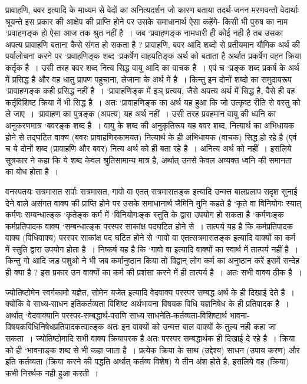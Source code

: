 {प्रावाहणि, बवर इत्यादि के माध्यम से वेदों का अनित्यदर्शन जो कारण बताया तदर्थ-जनन मरणवन्तो वेदार्थाः श्रूयन्ते इस प्रकार की आक्षेप की प्राप्ति होने पर उसके समाधानार्थ ऐसा कहेंगे- किसी भी पुरुष का नाम ‘प्रवाहणङ्क हो ऐसा आज तक श्रुत नहीं है~। जब ‘प्रवाहणङ्क नामधारी ही कोई नही है तब उसका अपत्य प्रावाहणि बताना कैसे संगत हो सकता है ? प्रावाहणि, बवर आदि शब्दो से प्रतीयमान यौगिक अर्थ की पर्यालोचना करने पर ‘प्रवाहणिङ्क शब्द ‘प्रकर्षेण वाहयतिङ्क अर्थ को बताता है अर्थात प्रकर्षेण वहन क्रिया कर्तृक है~। उसी तरह बवर शब्द नित्य सिद्ध वायु आदि का वाचक है~। एवं च ‘प्रङ्क शब्द प्रकर्ष के अर्थ में प्रसिद्ध है और वह धातु प्रापण पहुचाना, लेजाना के अर्थ में है~। किन्तु इन दोनों शब्दो का समुदायरूप ‘प्रावाहणङ्क कही प्रसिद्ध नहीं है~। ‘प्रावाहणिङ्क में इञ् प्रत्यय, जैसे अपत्य अर्थ में सिद्ध है, वैसे ही वह कर्तृविशिष्ट क्रिया में भी सिद्ध है~। अतः ‘प्रावाहणिङ्क का अर्थ यह हुआ कि जो उत्कृष्ट रीति से वस्तु को ले जाए~। ‘प्रावाहण का पुत्रङ्क (अपत्य) यह अर्थ नहीं~। उसी तरह प्रवहमान वायु की ध्वनि का अनुकरणमात्र ‘बवरङ्क शब्द है~। वायु के शब्द की अनुकृतिरूप यह बवर शब्द, नित्यार्थ का अभिधायक होने से तद्घटित वाक्य (बवरः प्रावाहणिरकामयत) नित्यार्थ के ही अभिधायक (वाचक) सिद्ध हो रहे है (एवं च ये दोनों शब्द (प्रावाहणि और बवर) नित्य अर्थ को ही बता रहे है~। अनित्य अर्थ को नहीं~। इसलिये सूत्रकार ने कहा कि ये शब्द केवल श्रुतिसामान्य मात्र है, अर्थात् उनसे केवल अव्यक्त ध्वनि की समानता का बोध होता है~।

वनस्पतयः सत्रमासत सर्पाः सत्रमासत, गावो वा एतत् सत्रमासतङ्क इत्यादि उन्मत्त बालप्रलाप सदृश सुनाई देने वाले असंगत वाक्य की प्राप्ति होने पर उसके समाधानार्थ जैमिनि मुनि कहते है ‘कृते वा विनियोगः स्यात् कर्मणः सम्बन्धात्ङ्क ‘कृतेङ्क कर्म में ‘विनियोगःङ्क स्तुति के द्वारा उपयोग हो सकता है ‘कर्मणःङ्क कर्मप्रतिपादक वाक्य ‘सम्बन्धात्ङ्क परस्पर साकांक्ष पदघटित होने से~। तात्पर्य यह है कि कर्मप्रतिपादक वाक्य (विधिवाक्य) परस्पर साकांक्ष पद घटित होने से ‘गावो वा एतत्सत्रमासतङ्क इत्यादि वाक्यों  का कर्म में स्तुति द्वारा उपयोग होता है~। निष्कर्ष यह है कि ‘गावो वा इत्यादि वाक्यों का स्वार्थ में तात्पर्य नहीं है~। किन्तु गो आदि जड़ पशुओ ने भी जब कर्मानुष्ठान किया तो विद्वान् लोग कर्म का अनुष्ठान करें इसमें सन्देह ही क्या है ? इस प्रकार उन वाक्यों का कर्म की प्रशंसा करने में ही तात्पर्य है~। अतः सभी वाक्य ठीक  है~।

ज्योतिष्टोमेन स्वर्गकामो यज्ञेत, सोमेन यजेत इत्यादि वेदवाक्य परस्पर सम्बद्ध अर्थ के ही दिखाई देते है~। क्योंकि वे साध्य-साधन इतिकर्तव्यता विशिष्ट अर्थभावना विषयक विधि यज्ञनिषेध के ही प्रतिपादक है~। अर्थात् ‘वेदवाक्यानि परस्पर-सम्बद्धार्थ-पराणि साध्य साधनेति-कर्तव्यता-विशिष्टार्थ भावना-विषयकविधिनिषेधप्रतिपादकत्वात्ङ्क अतः इन वाक्यों को उन्मत्त बाल वाक्यों के तुल्य नही कहा जा सकता~। ज्योतिष्टोमादि सभी वाक्य क्रियापरक है अतः परस्पर सम्बद्धार्थक ही दिखाई दे रहे है~। क्रिया को ही ‘भावनाङ्क शब्द से भी कहा जाता है~। प्रत्येक क्रिया के साथ (उद्देश्य) साधन (उपाय करण) और इति कर्तव्यता (क्रिया करने की पद्धति अर्थात् कर्तव्य विशेष) ये तीन अंश होते है, इसलिये वह (क्रिया) कभी निरर्थक नही हुआ करती~।

}
